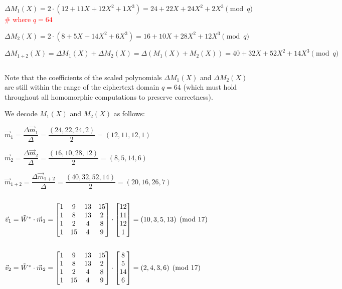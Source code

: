 $ $

$ $

$\Delta M_1(X) = 2\cdot(12 + 11X + 12X^2 + 1X^3) = 24 + 22X + 24X^2 + 2X^3 \pmod{q}$ \textcolor{red}{\text{ } \# where $q = 64$}

$\Delta M_2(X) = 2\cdot(8 + 5X + 14X^2 + 6X^3) = 16 + 10X + 28X^2 + 12X^3 \pmod{q}$

$\Delta M_{1+2}(X) = \Delta M_1(X) + \Delta M_2(X) = \Delta (M_1(X) + M_2(X)) = 40 + 32X + 52X^2 + 14X^3 \pmod{q}$

$ $

Note that the coefficients of the scaled polynomials $\Delta M_1(X)$ and $\Delta M_2(X)$ are still within the range of the ciphertext domain $q=64$ (which must hold throughout all homomorphic computations to preserve correctness). 

We decode $M_1(X)$ and $M_2(X)$ as follows: 

$\vec{m}_1 = \dfrac{\Delta \vec{m}_1}{\Delta} = \dfrac{(24, 22, 24, 2)}{2} = (12, 11, 12, 1)$

$\vec{m}_2 = \dfrac{\Delta \vec{m}_2}{\Delta} = \dfrac{(16, 10, 28, 12)}{2} = (8, 5, 14, 6)$

$\vec{m}_{1+2} = \dfrac{\Delta \vec{m}_{1+2}}{\Delta} = \dfrac{(40, 32, 52, 14)}{2} = (20, 16, 26, 7)$

$ $


$\vec{v}_1 = \tilde{W}^* \cdot \vec{m}_1 = \begin{bmatrix}
1 & 9 & 13 & 15\\
1 & 8 & 13 & 2\\
1 & 2 & 4 & 8\\
1 & 15 & 4 & 9\\
\end{bmatrix} \cdot \begin{bmatrix}
12\\11\\12\\1
\end{bmatrix} = (10, 3, 5, 13) \pmod{17}$

$ $

$\vec{v}_2 = \tilde{W}^* \cdot \vec{m}_2 = \begin{bmatrix}
1 & 9 & 13 & 15\\
1 & 8 & 13 & 2\\
1 & 2 & 4 & 8\\
1 & 15 & 4 & 9\\
\end{bmatrix} \cdot \begin{bmatrix}8\\5\\14\\6\end{bmatrix} = (2, 4, 3, 6) \pmod{17}$

